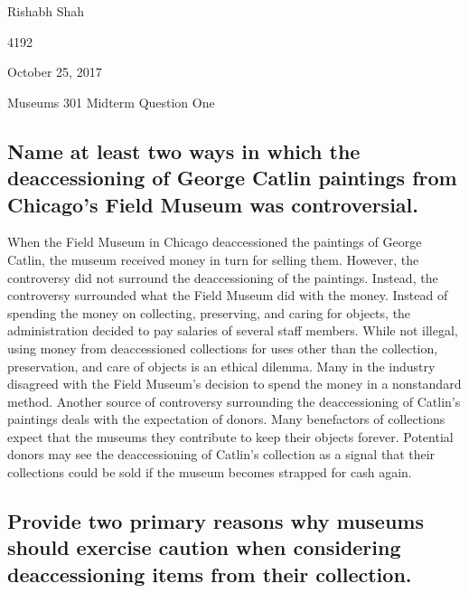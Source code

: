 \documentclass[11pt]{article}
\begin{document}
\begin{singlespacing}
{\Large\noindent Rishabh Shah

 4192

\noindent October 25, 2017

\noindent Museums 301 Midterm Question One}
\end{singlespacing}

\begin{singlespacing}
\subsection*{Name at least two ways in which the deaccessioning of George Catlin paintings from Chicago’s Field Museum was controversial.}
\end{singlespacing}

When the Field Museum in Chicago deaccessioned the paintings of George Catlin, the museum received money in turn for selling them. However, the controversy did not surround the deaccessioning of the paintings. Instead, the controversy surrounded what the Field Museum did with the money. Instead of spending the money on collecting, preserving, and caring for objects, the administration decided to pay salaries of several staff members. While not illegal, using money from deaccessioned collections for uses other than the collection, preservation, and care of objects is an ethical dilemma. Many in the industry disagreed with the Field Museum's decision to spend the money in a nonstandard method. Another source of controversy surrounding the deaccessioning of Catlin's paintings deals with the expectation of donors. Many benefactors of collections expect that the museums they contribute to keep their objects forever. Potential donors may see the deaccessioning of Catlin's collection as a signal that their collections could be sold if the museum becomes strapped for cash again.

\begin{singlespacing}
\subsection*{Provide two primary reasons why museums should exercise caution when considering deaccessioning items from their collection.}
\end{singlespacing}
\end{document}
